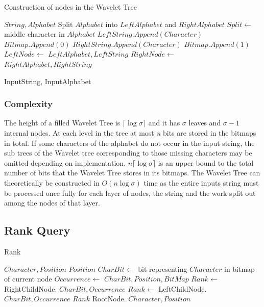 \begin{algorithm}
\caption{Construction of nodes in the Wavelet Tree}
\label{alg:ConstructNode}
\begin{algorithmic}
 {$String, Alphabet$}
	\State \Return
\EndIf
\State Split $Alphabet$ into $LeftAlphabet$ and $RightAlphabet$
\State $Split \gets$ middle character in $Alphabet$
		\State $LeftString.Append(Character)$
		\State $Bitmap.Append(0)$
	\Else
		\State $RightString.Append(Character)$
		\State $Bitmap.Append(1)$
	\EndIf
\EndFor
\State $LeftNode \gets$  {$LeftAlphabet, LeftString$}
\State $RightNode \gets$  {$RightAlphabet, RightString$}
\EndFunction

\State {} {InputString, InputAlphabet}
\end{algorithmic}
\end{algorithm}

\subsubsection{Complexity}
The height of a filled Wavelet Tree is  $\lceil \log \sigma \rceil$ and it has $\sigma$ leaves and $\sigma - 1$ internal nodes. 
At each level in the tree at most \textit{n} bits are stored in the bitmaps in total.
If some characters of the alphabet do not occur in the input string, the sub trees of the Wavelet tree corresponding to those missing characters may be omitted depending on implementation.
$n \lceil \log \sigma \rceil$ is an upper bound to the total number of bits that the Wavelet Tree stores in its bitmaps.
The Wavelet Tree can theoretically be constructed in $O(n \log \sigma)$ time as the entire inputs string must be processed once fully for each layer of nodes, the string and the work split out among the nodes of that layer.


\subsection{Rank Query}
\label{sec:rankDescription}

\begin{algorithm}
\caption{Rank}
\label{alg:rank}
\begin{algorithmic} 
 {$Character, Position$}
\State \Return $Position$
\EndIf
\State $CharBit \gets$ bit representing $Character$ in bitmap of current node
\State $Occurrence \gets$  {$CharBit, Position, BitMap$}
	\State $Rank \gets$ RightChildNode. {$CharBit, Occurrence$}
\Else
	\State $Rank \gets$ LeftChildNode. {$CharBit, Occurrence$}
\EndIf
\State \Return $Rank$ 
\EndFunction
\State RootNode. {$Character, Position$}
\end{algorithmic}
\end{algorithm}

